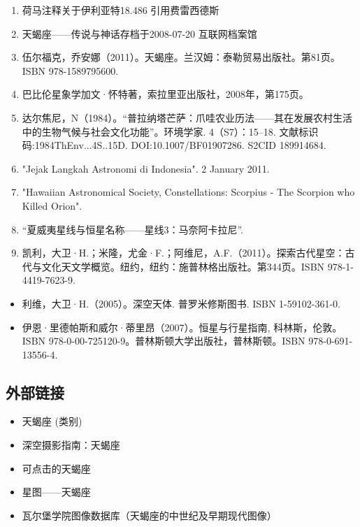 \begin{enumerate}
\item 荷马注释关于伊利亚特18.486 引用费雷西德斯
\item 天蝎座——传说与神话存档于2008-07-20 互联网档案馆
\item 伍尔福克，乔安娜（2011）。天蝎座。兰汉姆：泰勒贸易出版社。第81页。ISBN 978-1589795600.
\item 巴比伦星象学加文·怀特著，索拉里亚出版社，2008年，第175页。
\item 达尔焦尼，N（1984）。“普拉纳塔芒萨：爪哇农业历法——其在发展农村生活中的生物气候与社会文化功能”。环境学家. 4（S7）：15–18. 文献标识码:1984ThEnv...4S..15D. DOI:10.1007/BF01907286. S2CID 189914684.
\item "Jejak Langkah Astronomi di Indonesia". 2 January 2011.
\item "Hawaiian Astronomical Society, Constellations: Scorpius - The Scorpion who Killed Orion".
\item “夏威夷星线与恒星名称——星线3：马奈阿卡拉尼”.
\item 凯利，大卫·H.；米隆，尤金·F.；阿维尼，A.F.（2011）。探索古代星空：古代与文化天文学概览。纽约，纽约：施普林格出版社。第344页。ISBN 978-1-4419-7623-9.
\end{enumerate}
\begin{itemize}
\item 利维，大卫·H.（2005）。深空天体. 普罗米修斯图书. ISBN 1-59102-361-0.
\item 伊恩·里德帕斯和威尔·蒂里昂（2007）。恒星与行星指南, 科林斯，伦敦。ISBN 978-0-00-725120-9。普林斯顿大学出版社，普林斯顿。ISBN 978-0-691-13556-4.
\end{itemize}
\subsection{外部链接}
\begin{itemize}
\item 天蝎座 (类别)
\item 深空摄影指南：天蝎座
\item 可点击的天蝎座
\item 星图——天蝎座
\item 瓦尔堡学院图像数据库（天蝎座的中世纪及早期现代图像）
\end{itemize}